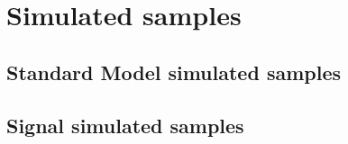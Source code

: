 \clearpage
\section{Simulated samples}
\subsection{Standard Model simulated samples}
\label{sec:sm-mc}
\subsection{Signal simulated samples}
\label{sec:signal-simulation}